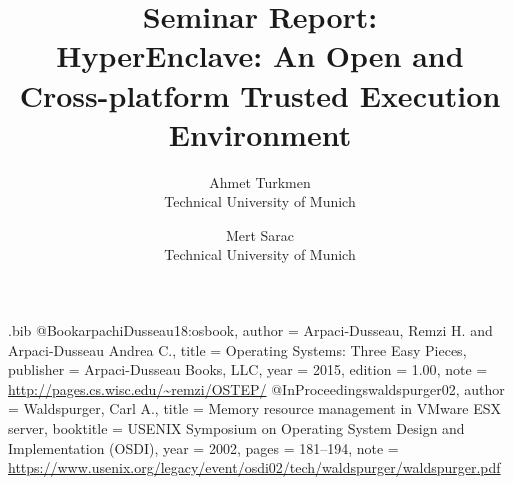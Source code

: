\usepackage{tikz}
\usepackage{amsmath}
\usepackage{float}
\usepackage{filecontents}
\usepackage{enumitem}
\begin{filecontents}{\jobname.bib}
@Book{arpachiDusseau18:osbook,
  author =       {Arpaci-Dusseau, Remzi H. and Arpaci-Dusseau Andrea C.},
  title =        {Operating Systems: Three Easy Pieces},
  publisher =    {Arpaci-Dusseau Books, LLC},
  year =         2015,
  edition =      {1.00},
  note =         {\url{http://pages.cs.wisc.edu/~remzi/OSTEP/}}
}
@InProceedings{waldspurger02,
  author =       {Waldspurger, Carl A.},
  title =        {Memory resource management in {VMware ESX} server},
  booktitle =    {USENIX Symposium on Operating System Design and
                  Implementation (OSDI)},
  year =         2002,
  pages =        {181--194},
  note =         {\url{https://www.usenix.org/legacy/event/osdi02/tech/waldspurger/waldspurger.pdf}}}
\end{filecontents}



\date{}

\title{\Large \bf Seminar Report: \\
HyperEnclave: An Open and Cross-platform Trusted Execution Environment}

\author{
{\rm Ahmet Turkmen}\\
Technical University of Munich
\and
{\rm Mert Sarac}\\
Technical University of Munich
} %

\maketitle

% 
\begin{abstract}
% 

\end{abstract}


